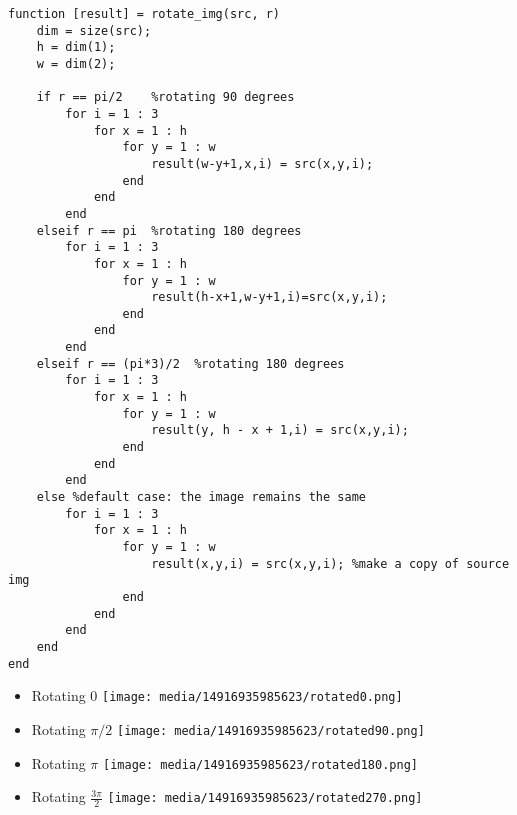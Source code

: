 \documentclass[]{article}
\providecommand{\tightlist}{%
  \setlength{\itemsep}{0pt}\setlength{\parskip}{0pt}}
\begin{document}
\begin{verbatim}
function [result] = rotate_img(src, r)
    dim = size(src);
    h = dim(1);
    w = dim(2); 
    
    if r == pi/2    %rotating 90 degrees
        for i = 1 : 3
            for x = 1 : h
                for y = 1 : w
                    result(w-y+1,x,i) = src(x,y,i);
                end
            end
        end
    elseif r == pi  %rotating 180 degrees
        for i = 1 : 3
            for x = 1 : h
                for y = 1 : w  
                    result(h-x+1,w-y+1,i)=src(x,y,i);
                end
            end
        end
    elseif r == (pi*3)/2  %rotating 180 degrees
        for i = 1 : 3
            for x = 1 : h
                for y = 1 : w
                    result(y, h - x + 1,i) = src(x,y,i);
                end
            end
        end
    else %default case: the image remains the same
        for i = 1 : 3
            for x = 1 : h
                for y = 1 : w
                    result(x,y,i) = src(x,y,i); %make a copy of source img
                end
            end
        end
    end
end
\end{verbatim}

\begin{itemize}
\tightlist
\item
  Rotating 0 \texttt{[image: media/14916935985623/rotated0.png]}
\item
  Rotating \(\pi/2\)
  \texttt{[image: media/14916935985623/rotated90.png]}
\item
  Rotating \(\pi\) \texttt{[image: media/14916935985623/rotated180.png]}
\item
  Rotating \(\frac{3\pi}{2}\)
  \texttt{[image: media/14916935985623/rotated270.png]}
\end{itemize}
\end{document}

